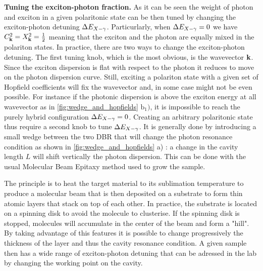\textbf{Tuning the exciton-photon fraction.} As it can be seen the weight of photon and exciton in a given polaritonic state can be then tuned by changing the exciton-photon detuning 
$\Delta E_{X-\gamma}$. Particurlarly, when $\Delta E_{X-\gamma} = 0$ we have $C_{\mathbf{k}}^2= X_{\mathbf{k}}^2 = \frac{1}{2}$ meaning that the exciton and the photon are equally mixed in the polariton states. In practice, there are two ways to change the exciton-photon detuning. The first tuning knob, which is the most obvious, is the wavevector $\mathbf{k}$. Since the exciton
dispersion is flat with respect to the photon it reduces to move on the photon dispersion curve. Still, exciting a polariton state with a given set of Hopfield coefficients will fix the wavevector and, in some case might not be even possible. 
For instance if the photonic dispersion is above the exciton energy at all wavevector as in   \autoref{fig:wedge_and_hopfields} $\mathrm{b_1)}$, it is impossible to reach the purely hybrid configuration $\Delta E_{X-\gamma} = 0 $. Creating an arbitrary polaritonic state thus require a second knob to tune $\Delta E_{X-\gamma}$. It is generally done by introducing a small wedge between the two DBR that will change the photon resonance condition as shown in \autoref{fig:wedge_and_hopfields} a) : a change in the cavity length $L$ will shift vertically the photon dispersion.
 This can be done with the usual Molecular Beam Epitaxy method used to grow the sample.

The principle is to heat the target material to its sublimation temperature to produce a molecular beam that is then deposited on a substrate to form thin atomic layers that stack on top of each other.
In practice, the substrate is located on a spinning disk to avoid the molecule to clusterise. If the spinning disk is stopped, molecules will accumulate in the center of the beam and form a "hill".
By taking advantage of this features it is possible to change progressively the thickness of the layer and thus the cavity resonance condition. A given sample
then has a wide range of exciton-photon detuning that can be adressed in the lab by changing the working point on the cavity. 

